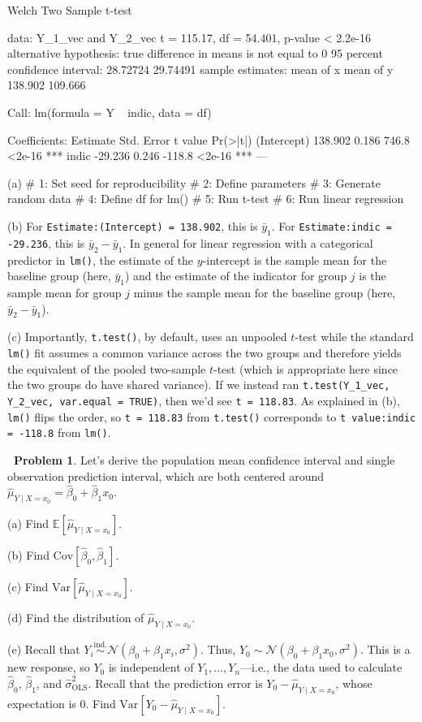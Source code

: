 \documentclass[12pt,oneside]{article}
\newcommand{\E}{\mathbb{E}}
\newcommand{\Var}{\text{Var}}
\newcommand{\Cov}{\text{Cov}}
\newcommand{\OLS}{\text{OLS}}
\newcommand{\N}{\mathcal{N}}
\newcommand{\simind}{\overset{\text{ind.}}{\sim}}
\theoremstyle{definition}
\newtheorem{problem}{\faPen \ Problem}
\theoremstyle{remark}
\begin{document}
\begin{routput}
	Welch Two Sample t-test

data:  Y_1_vec and Y_2_vec
t = 115.17, df = 54.401, p-value < 2.2e-16
alternative hypothesis: true difference in means is not equal to 0
95 percent confidence interval:
 28.72724 29.74491
sample estimates:
mean of x mean of y 
  138.902   109.666 

Call:
lm(formula = Y ~ indic, data = df)

Coefficients:
            Estimate Std. Error t value Pr(>|t|)    
(Intercept)  138.902      0.186   746.8   <2e-16 ***
indic        -29.236      0.246  -118.8   <2e-16 ***
---
\end{routput}

\begin{solutionbox}
(a) 
\# 1: Set seed for reproducibility
\# 2: Define parameters
\# 3: Generate random data
\# 4: Define df for lm()
\# 5: Run t-test
\# 6: Run linear regression

(b) For \texttt{Estimate:(Intercept) = 138.902}, this is $\bar{y}_1$. For \texttt{Estimate:indic = -29.236}, this is $\bar{y}_2 - \bar{y}_1$. In general for linear regression with a categorical predictor in \texttt{lm()}, the estimate of the $y$-intercept is the sample mean for the baseline group (here, $\bar{y}_1$) and the estimate of the indicator for group $j$ is the sample mean for group $j$ minus the sample mean for the baseline group (here, $\bar{y}_2 - \bar{y}_1$).

(c) Importantly, \texttt{t.test()}, by default, uses an unpooled $t$-test while the standard \texttt{lm()} fit assumes a common variance across the two groups and therefore yields the equivalent of the pooled two-sample $t$-test (which is appropriate here since the two groups do have shared variance). If we instead ran \texttt{t.test(Y\_1\_vec, Y\_2\_vec, var.equal = TRUE)}, then we'd see \texttt{t = 118.83}. As explained in (b), \texttt{lm()} flips the order, so \texttt{t = 118.83} from \texttt{t.test()} corresponds to \texttt{t value:indic = -118.8} from \texttt{lm()}.
\end{solutionbox}

\begin{problem}
Let's derive the population mean confidence interval and single observation prediction interval, which are both centered around $\hat{\mu}_{Y \mid X = x_0} = \hat{\beta}_0 + \hat{\beta}_1 x_0$.

(a) Find $\E[\hat{\mu}_{Y \mid X = x_0}]$.

(b) Find $\Cov[\hat{\beta}_0, \hat{\beta}_1]$.

(c) Find $\Var[\hat{\mu}_{Y \mid X = x_0}]$.

(d) Find the distribution of $\hat{\mu}_{Y \mid X = x_0}$.

(e) Recall that $Y_i \simind \N(\beta_0 + \beta_1 x_i, \sigma^2)$. Thus, $Y_0 \sim \N(\beta_0 + \beta_1 x_0, \sigma^2)$. This is a new response, so $Y_0$ is independent of $Y_1, \ldots, Y_n$—i.e., the data used to calculate $\hat{\beta}_0$, $\hat{\beta}_1$, and $\hat{\sigma}^2_{\OLS}$. Recall that the prediction error is $Y_0 - \hat{\mu}_{Y \mid X = x_0}$, whose expectation is $0$. Find $\Var[Y_0 - \hat{\mu}_{Y \mid X = x_0}]$.
\end{problem}
\end{document}
